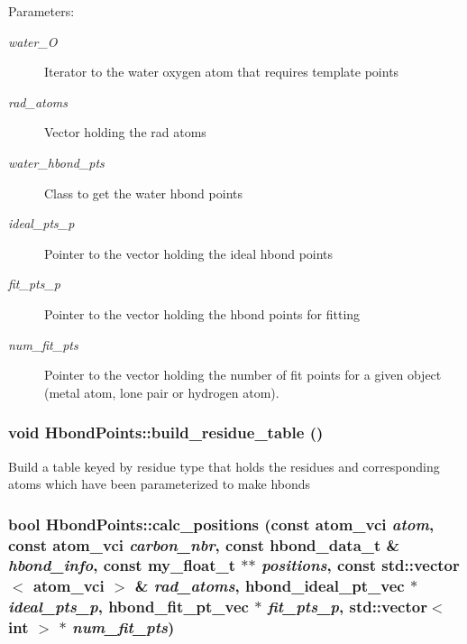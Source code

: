 \begin{Desc}
\item[Parameters:]
\begin{description}
\item[{\em water\_\-O}]Iterator to the water oxygen atom that requires template points \item[{\em rad\_\-atoms}]Vector holding the rad atoms \item[{\em water\_\-hbond\_\-pts}]Class to get the water hbond points \item[{\em ideal\_\-pts\_\-p}]Pointer to the vector holding the ideal hbond points \item[{\em fit\_\-pts\_\-p}]Pointer to the vector holding the hbond points for fitting \item[{\em num\_\-fit\_\-pts}]Pointer to the vector holding the number of fit points for a given object (metal atom, lone pair or hydrogen atom). \end{description}
\end{Desc}
\subsubsection{\setlength{\rightskip}{0pt plus 5cm}void Hbond\-Points::build\_\-residue\_\-table ()\hspace{0.3cm}{\tt  [private]}}\label{classSimSite3D_1_1HbondPoints_1d461841f496a487d56a8041b3443fc1}


Build a table keyed by residue type that holds the residues and corresponding atoms which have been parameterized to make hbonds 
\subsubsection{\setlength{\rightskip}{0pt plus 5cm}bool Hbond\-Points::calc\_\-positions (const atom\_\-vci {\em atom}, const atom\_\-vci {\em carbon\_\-nbr}, const hbond\_\-data\_\-t \& {\em hbond\_\-info}, const my\_\-float\_\-t $\ast$$\ast$ {\em positions}, const std::vector$<$ atom\_\-vci $>$ \& {\em rad\_\-atoms}, \bf{hbond\_\-ideal\_\-pt\_\-vec} $\ast$ {\em ideal\_\-pts\_\-p}, \bf{hbond\_\-fit\_\-pt\_\-vec} $\ast$ {\em fit\_\-pts\_\-p}, std::vector$<$ int $>$ $\ast$ {\em num\_\-fit\_\-pts})\hspace{0.3cm}{\tt  [private]}}\label{classSimSite3D_1_1HbondPoints_04d88991f26fd35fddb13e8fd9b24a02}


